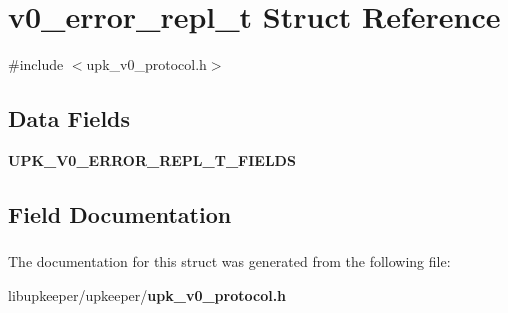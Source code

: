 \section{v0\_\-error\_\-repl\_\-t Struct Reference}
\label{structv0__error__repl__t}


{\ttfamily \#include $<$upk\_\-v0\_\-protocol.h$>$}

\subsection*{Data Fields}
\begin{DoxyCompactItemize}
\item 
{\bf UPK\_\-V0\_\-ERROR\_\-REPL\_\-T\_\-FIELDS}
\end{DoxyCompactItemize}


\subsection{Field Documentation}
\subsubsection[{UPK\_\-V0\_\-ERROR\_\-REPL\_\-T\_\-FIELDS}]{}\label{structv0__error__repl__t_a6cd78f3b331af3339fb10cbd04ae4d7c}


The documentation for this struct was generated from the following file:\begin{DoxyCompactItemize}
\item 
libupkeeper/upkeeper/{\bf upk\_\-v0\_\-protocol.h}\end{DoxyCompactItemize}
